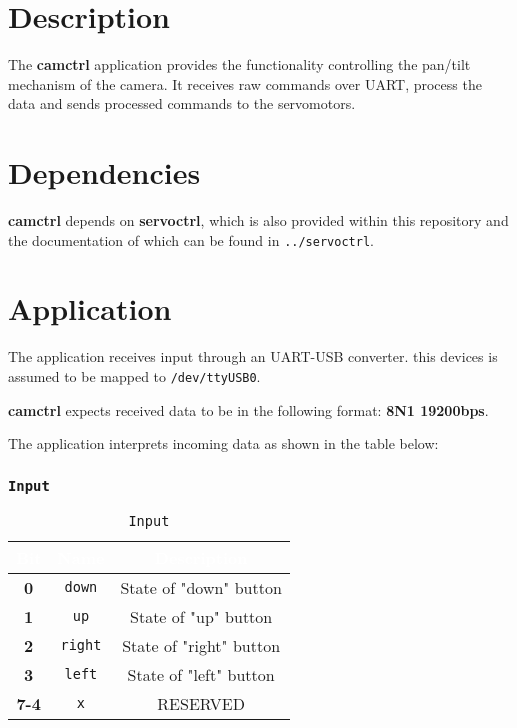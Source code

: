 \section{Description}
The \textbf{camctrl} application provides the functionality controlling the
pan/tilt mechanism of the camera.
It receives raw commands over UART, process the data and sends processed
commands to the servomotors.

\section{Dependencies}
\textbf{camctrl} depends on \textbf{servoctrl}, which is also provided within
this repository and the documentation of which can be found in
\texttt{../servoctrl}.

\section{Application}
The application receives input through an UART-USB converter. this devices is
assumed to be mapped to \texttt{/dev/ttyUSB0}.

\textbf{camctrl} expects received data to be in the following format:
\textbf{8N1 19200bps}.

The application interprets incoming data as shown in the table below:

   \subsubsection{\texttt{Input}}
   \begin{table}[!htb]
      \begin{center}
         \begin{tabular}{|c|c|c|}
            \rowcolor{black}
            \textcolor{white}{\textbf{Bit}}  &
            \textcolor{white}{\textbf{Name}} &
            \textcolor{white}{\textbf{Description}}\\
            \hline
            \hline
            \textbf{0}   & \texttt{down}  & State of "down" button \\
            \hline
            \textbf{1}   & \texttt{up}    & State of "up" button \\
            \hline
            \textbf{2}   & \texttt{right} & State of "right" button \\
            \hline
            \textbf{3}   & \texttt{left}  & State of "left" button \\
            \hline
            \textbf{7-4} & \texttt{x} & RESERVED \\
            \hline
         \end{tabular}
         \caption{\texttt{Input}}
         \label{table:input}
      \end{center}
   \end{table}

